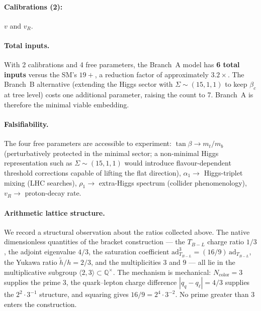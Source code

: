 \documentclass[11pt,a4paper]{article}
\theoremstyle{plain}
\theoremstyle{definition}
\theoremstyle{remark}
\begin{document}
\paragraph{Calibrations (2):} $v$ and $v_R$.

\paragraph{Total inputs.}
With 2 calibrations and 4 free parameters,
the Branch~A model has \textbf{6 total inputs} versus the SM's
$19+$, a reduction factor of approximately $3.2\times$.
The Branch~B alternative (extending the Higgs sector with
$\Sigma \sim (15,1,1)$ to keep $\beta_c$ at tree level) costs one
additional parameter, raising the count to 7.  Branch~A is
therefore the minimal viable embedding.

\paragraph{Falsifiability.}
The four free parameters are accessible to experiment:
$\tan\beta \to m_t/m_b$ (perturbatively protected in the minimal
sector; a non-minimal Higgs representation such as $\Sigma \sim
(15,1,1)$ would introduce flavour-dependent threshold corrections
capable of lifting the flat direction),
$\alpha_1 \to$ Higgs-triplet mixing (LHC searches),
$\rho_1 \to$ extra-Higgs spectrum (collider phenomenology),
$v_R \to$ proton-decay rate.

\paragraph{Arithmetic lattice structure.}
We record a structural observation about the ratios collected above.
The native dimensionless quantities of the bracket
construction --- the $T_{B-L}$ charge ratio $1/3$, the adjoint
eigenvalue $4/3$, the saturation coefficient
$\mathrm{ad}_{T_{B-L}}^3 = (16/9)\,\mathrm{ad}_{T_{B-L}}$, the Yukawa ratio
$\tilde{h}/h = 2/3$, and the multiplicities $3$ and $9$ --- all lie
in the multiplicative subgroup
$\langle 2, 3 \rangle \subset \mathbb{Q}^\times$.  The mechanism is
mechanical: $N_{\mathrm{color}} = 3$ supplies the prime $3$, the
quark--lepton charge difference $|q_q - q_\ell| = 4/3$ supplies the
$2^2 \cdot 3^{-1}$ structure, and squaring gives
$16/9 = 2^4 \cdot 3^{-2}$.  No prime greater than $3$ enters the
construction.
\end{document}
